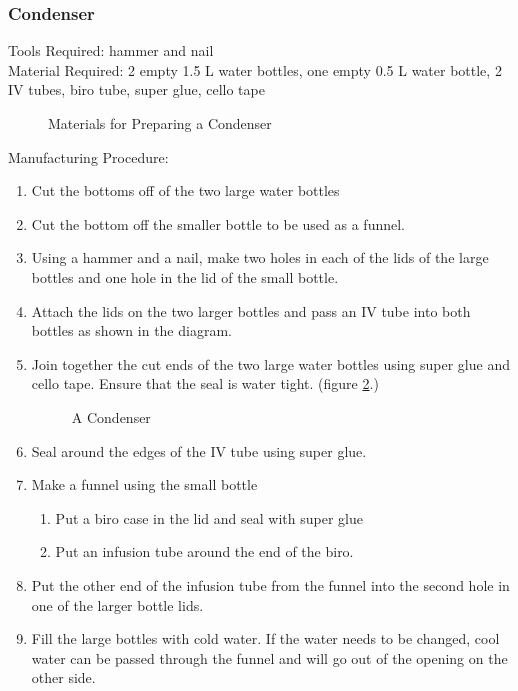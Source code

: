 \subsubsection*{Condenser}
Tools Required: hammer and nail\\
Material Required: 2 empty 1.5 L water bottles, one empty 0.5 L water bottle, 2 IV tubes, biro tube, super glue, cello tape\\

\begin{figure}[h!]
\begin{center}
\def\svgwidth{250pt}

\caption{Materials for Preparing a Condenser}
\label{fig:condenser-materials}
\end{center}
\end{figure}

Manufacturing Procedure:
\begin{enumerate}
\item{Cut the bottoms off of the two large water bottles}
\item{Cut the bottom off the smaller bottle to be used as a funnel.}
\item{Using a hammer and a nail, make two holes in each of the lids of the large bottles and one hole in the lid of the small bottle.}
\item{Attach the lids on the two larger bottles and pass an IV tube into both bottles as shown in the diagram.}
\item {Join together the cut ends of the two large water bottles using super glue and cello tape. Ensure that the seal is water tight. (figure \ref{fig:condenser}.)}


\begin{figure}[h!]
\begin{center}
\def\svgwidth{350pt}

\caption{A Condenser}
\label{fig:condenser}
\end{center}
\end{figure}


\item {Seal around the edges of the IV tube using super glue.}
\item {Make a funnel using the small bottle}
\begin{enumerate}
 \item {Put a biro case in the lid and seal with super glue}
 \item{Put an infusion tube around the end of the biro.}
\end{enumerate}
\item{Put the other end of the infusion tube from the funnel into the second hole in one of the larger bottle lids.}
\item{Fill the large bottles with cold water. If the water needs to be changed, cool water can be passed through the funnel and will go out of the opening on the other side.}
\end{enumerate}





